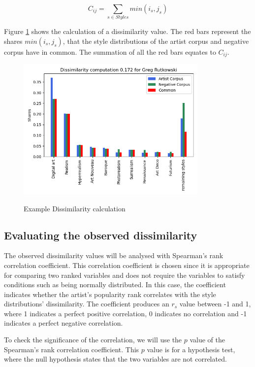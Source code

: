\[ C_{ij} = \sum_{s \in Styles} min(i_s,j_s)\]

Figure \ref{fig:dissimilarity_calculation_example} shows the calculation of a dissimilarity value. The red bars represent the shares \(min(i_s,j_s)\), that the style distributions of the artist corpus and negative corpus have in common. The summation of all the red bars equates to \(C_{ij}\). 

\begin{figure}[h]
    \begin{center}
        \includegraphics[height=7cm]{Bilder/dissimilarity_calculation_example.png}\\[2.5ex]
    \end{center}
\caption{Example Dissimilarity calculation}
\label{fig:dissimilarity_calculation_example}
\end{figure}



\subsection{Evaluating the observed dissimilarity}

The observed dissimilarity values will be analysed with Spearman's rank correlation coefficient. This correlation coefficient is chosen since it is appropriate for comparing two ranked variables and does not require the variables to satisfy conditions such as being normally distributed. In this case, the coefficient indicates whether the artist's popularity rank correlates with the style distributions' dissimilarity. The coefficient produces an \(r_s\) value between -1 and 1, where 1 indicates a perfect positive correlation, 0 indicates no correlation and -1 indicates a perfect negative correlation.

To check the significance of the correlation, we will use the \(p\) value of the Spearman's rank correlation coefficient. This \(p\) value is for a hypothesis test, where the null hypothesis states that the two variables are not correlated.





